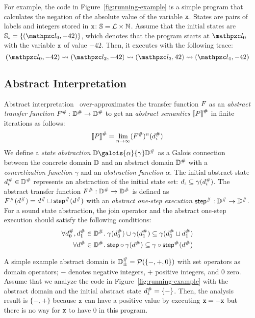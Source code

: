 For example, the code in Figure~\ref{fig:running-example} is a simple program
that calculates the negation of the absolute value of the variable $\texttt{x}$.
States are pairs of labels and integers stored in $\texttt{x}$: $\mathbb{S} = \mathcal{L}
\times \mathbb{N}$.  Assume that the initial states are $\istset = \{ (\lab_0,
-42) \}$, which denotes that the program starts at $\lab_0$
with the variable $\texttt{x}$ of value $-42$.
Then, it executes with the following trace:
\[
  (\lab_0, -42) \trans (\lab_2, -42) \trans (\lab_3, 42) \trans (\lab_4, -42)
\]


\subsection{Abstract Interpretation}\label{sec:ai}
Abstract interpretation~\cite{abs-interp-1977, abs-interp-1992}
over-approximates the transfer function $F$ as an \textit{abstract transfer
function} ${F}^{\#}: {\mathbb{D}}^{\#} \rightarrow {\mathbb{D}}^{\#}$ to get an
\textit{abstract semantics} ${\llbracket P \rrbracket}^{\#}$ in finite iterations as follows:
\[
    {\llbracket P \rrbracket}^{\#} = \underset{n \rightarrow
    \infty}{\lim}{({F}^{\#})^n({d}^{\#}_\iota)}\\
\]
We define a \textit{state abstraction} $\dom \galois{\alpha}{\gamma} \absdom$ as
a Galois connection between the concrete domain $\mathbb{D}$ and an abstract domain
${\mathbb{D}}^{\#}$ with a \textit{concretization function} $\gamma$ and an
\textit{abstraction function} $\alpha$.  The initial abstract state ${d}^{\#}_\iota
\in {\mathbb{D}}^{\#}$ represents an abstraction of the initial state set: $d_\iota
\subseteq \gamma({d}^{\#}_\iota)$.  The abstract transfer function ${F}^{\#}:
{\mathbb{D}}^{\#} \rightarrow {\mathbb{D}}^{\#}$ is defined as ${F}^{\#}({d}^{\#}) = {d}^{\#}
\sqcup {\textsf{step}}^{\#}({d}^{\#})$ with an \textit{abstract one-step execution}
${\textsf{step}}^{\#}: {\mathbb{D}}^{\#} \rightarrow {\mathbb{D}}^{\#}$.  For a sound state abstraction, the
join operator and the abstract one-step execution should satisfy the following
conditions:
\begin{align}
  \forall {d}^{\#}_0, {d}^{\#}_1 \in {\mathbb{D}}^{\#} & . \; \gamma({d}^{\#}_0) \cup
  \gamma({d}^{\#}_1) \subseteq \gamma({d}^{\#}_0 \sqcup
  {d}^{\#}_1) \label{equ:sound-join}\\
  \forall {d}^{\#} \in {\mathbb{D}}^{\#} & . \; \textsf{step} \circ \gamma({d}^{\#}) \subseteq
  \gamma \circ {\textsf{step}}^{\#}({d}^{\#}) \label{equ:sound-step}
\end{align}

A simple example abstract domain is ${\mathbb{D}}^{\#}_\pm = \mathcal{P}(\{ -, +, 0 \})$ with
set operators as domain operators; $-$ denotes negative integers, $+$ positive
integers, and $0$ zero.  Assume that we analyze the code in
Figure~\ref{fig:running-example} with the abstract domain and the initial abstract state ${d}^{\#}_\iota =
\{ - \}$. Then, the analysis result is $\{ -, + \}$ because $\texttt{x}$ can
have a positive value by executing $\texttt{x} = -\texttt{x}$ but there is no
way for $\texttt{x}$ to have $0$ in this program.


